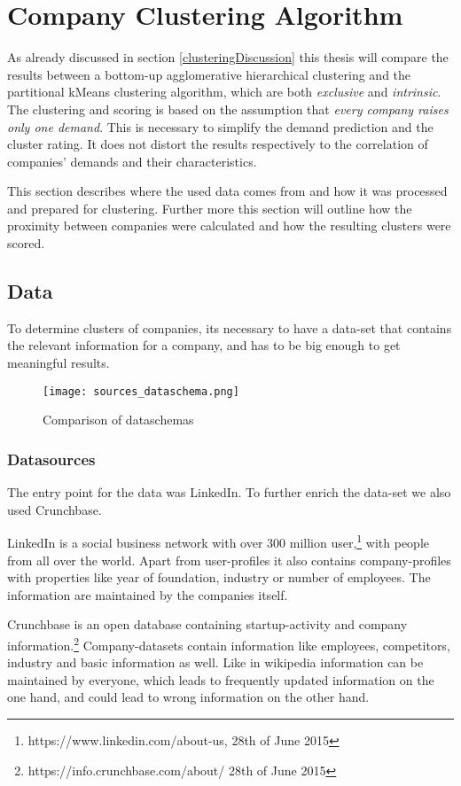 \section{Company Clustering Algorithm}
As already discussed in section \ref{clusteringDiscussion} this thesis will compare the results between a bottom-up
agglomerative hierarchical clustering and the partitional kMeans clustering algorithm, which are both \emph{exclusive}
and \emph{intrinsic}. The clustering and scoring is based on the assumption that \emph{every company raises only one demand}.
This is necessary to simplify the demand prediction and the cluster rating. It does not distort the results respectively
to the correlation of companies' demands and their characteristics.

This section describes where the used data comes from and how it was processed and prepared for clustering. Further more this
section will outline how the proximity between companies were calculated and how the resulting clusters were scored.

\subsection{Data}
To determine clusters of companies, its necessary to have a data-set that contains the relevant information
for a company, and has to be big enough to get meaningful results.

\begin{figure}[ht]
\texttt{[image: sources\_dataschema.png]}
\centering
\caption{Comparison of dataschemas}
\label{fig:sourcesSchemas}
\end{figure}

\subsubsection{Datasources}
The entry point for the data was LinkedIn. To further enrich the data-set we also used Crunchbase.

LinkedIn is a social business network with over 300 million user,\footnote{https://www.linkedin.com/about-us, 28th of June 2015} with people from all over the world. Apart
from user-profiles it also contains company-profiles with properties like year of foundation, industry or
number of employees. The information are maintained by the companies itself.

Crunchbase is an open database containing startup-activity and company information.\footnote{https://info.crunchbase.com/about/ 28th of June 2015} Company-datasets contain information
like employees, competitors, industry and basic information as well. Like in wikipedia information can be maintained by everyone,
which leads to frequently updated information on the one hand, and could lead to wrong information on the other hand.

